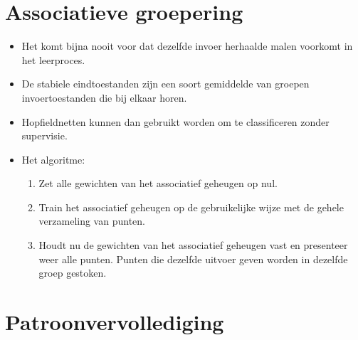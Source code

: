 \section{Associatieve groepering}
\begin{itemize}
    \item Het komt bijna nooit voor dat dezelfde invoer herhaalde malen voorkomt in het leerproces.
    \item De stabiele eindtoestanden zijn een soort gemiddelde van groepen invoertoestanden die bij elkaar horen.
    \item Hopfieldnetten kunnen dan gebruikt worden om te classificeren zonder supervisie.
    \item Het algoritme:
    \begin{enumerate}
        \item Zet alle gewichten van het associatief geheugen op nul.
        \item Train het associatief geheugen op de gebruikelijke wijze met de gehele verzameling van punten.
        \item Houdt nu de gewichten van het associatief geheugen vast en presenteer weer alle punten. Punten die dezelfde uitvoer geven worden in dezelfde groep gestoken.
    \end{enumerate}
\end{itemize}

\section{Patroonvervollediging}